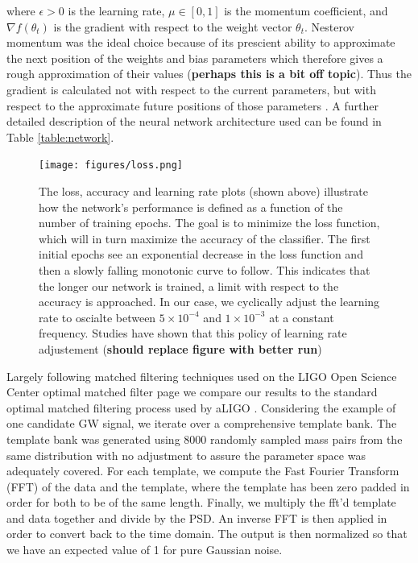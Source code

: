 \documentclass[%
 amsmath,amssymb,
 aps,
 twocolumn,
 prl,
 reprint,
floatfix,
]{revtex4-1}
\begin{document}
where $\epsilon > 0$ is the learning rate, $\mu \in [0,1]$ is the momentum coefficient, and $\nabla f(\theta_{t})$ is the gradient with respect to the weight vector $\theta_{t}$. Nesterov momentum was the ideal choice because of its prescient ability to approximate the next position of the weights and bias parameters which therefore gives a rough approximation of their values (\textbf{perhaps this is a bit off topic}). Thus the gradient is calculated not with respect to the current parameters, but with respect to the approximate future positions of those parameters \cite{Sutskever:2013:IIM:3042817.3043064}. A further detailed description of the neural network architecture used can be found in Table \ref{table:network}.

\begin{figure}[!h]
 \texttt{[image: figures/loss.png]}
 \caption{\label{fig:loss_curve} The loss, accuracy and learning rate plots (shown above) illustrate how the network's performance is defined as a function of the number of training epochs. The goal is to minimize the loss function, which will in turn maximize the accuracy of the classifier. The first initial epochs see an exponential decrease in the loss function and then a slowly falling monotonic curve to follow. This indicates that the longer our network is trained, a limit with respect to the accuracy is approached. In our case, we cyclically adjust the learning rate to oscialte between $5 \times 10^{-4}$ and $1 \times 10^{-3}$ at a constant frequency. Studies have shown that this policy of learning rate adjustement (\textbf{should replace figure with better run})
}
\end{figure}

Largely following matched filtering techniques used on the LIGO Open Science Center optimal matched filter page \cite{1742-6596-610-1-012021} we compare our results to the standard optimal matched filtering process used by aLIGO \cite{PhysRevD.85.122006}. Considering the example of one candidate GW signal, we iterate over a comprehensive template bank. The template bank was generated using 8000 randomly sampled mass pairs from the same distribution with no adjustment to assure the parameter space was adequately covered. For each template, we compute the Fast Fourier Transform (FFT) of the data and the template, where the template has been zero padded in order for both to be of the same length. Finally, we multiply the fft'd template and data together and divide by the PSD. An inverse FFT is then applied in order to convert back to the time domain. The output is then normalized so that we have an expected value of 1 for pure Gaussian noise.
\end{document}
